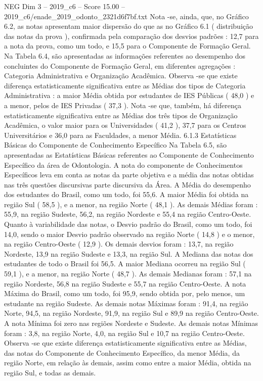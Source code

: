 \begin{textsample}{NEG Dim 3 – 2019\_c6 – Score 15.00 – 2019\_c6/enade\_2019\_odonto\_2321d6f7bf.txt}
Nota -se, ainda, que, no Gráfico 6.2, as notas apresentam maior dispersão do que as no Gráfico 6.1 ( distribuição das notas da prova ), confirmada pela comparação dos desvios padrões : 12,7 para a nota da prova, como um todo, e 15,5 para o Componente de Formação Geral.
Na Tabela 6.4, são apresentadas as informações referentes ao desempenho dos concluintes do Componente de Formação Geral, em diferentes agregações : Categoria Administrativa e Organização Acadêmica.
Observa -se que existe diferença estatisticamente significativa entre as Médias dos tipos de Categoria Administrativa : a maior Média obtida por estudantes de IES Públicas ( 48,0 ) e a menor, pelos de IES Privadas ( 37,3 ).
Nota -se que, também, há diferença estatisticamente significativa entre as Médias dos três tipos de Organização Acadêmica, o valor maior para os Universidades ( 41,2 ), 37,7 para os Centros Universitários e 36,0 para as Faculdades, a menor Média. 6.1.3 Estatísticas Básicas do Componente de Conhecimento Específico Na Tabela 6.5, são apresentadas as Estatísticas Básicas referentes ao Componente de Conhecimento Específico da área de Odontologia.
A nota do componente de Conhecimentos Específicos leva em conta as notas da parte objetiva e a média das notas obtidas nas três questões discursivas parte discursiva da Área.
A Média do desempenho dos estudantes do Brasil, como um todo, foi 55,6.
A maior Média foi obtida na região Sul ( 58,5 ), e a menor, na região Norte ( 48,1 ).
As demais Médias foram : 55,9, na região Sudeste, 56,2, na região Nordeste e 55,4 na região Centro-Oeste.
Quanto à variabilidade das notas, o Desvio padrão do Brasil, como um todo, foi 14,0, sendo o maior Desvio padrão observado na região Norte ( 14,8 ) e o menor, na região Centro-Oeste ( 12,9 ).
Os demais desvios foram : 13,7, na região Nordeste, 13,9 na região Sudeste e 13,3, na região Sul.
A Mediana das notas dos estudantes de todo o Brasil foi 56,5.
A maior Mediana ocorreu na região Sul ( 59,1 ), e a menor, na região Norte ( 48,7 ).
As demais Medianas foram : 57,1 na região Nordeste, 56,8 na região Sudeste e 55,7 na região Centro-Oeste.
A nota Máxima do Brasil, como um todo, foi 95,9, sendo obtida por, pelo menos, um estudante na região Sudeste.
As demais notas Máximas foram : 91,4, na região Norte, 94,5, na região Nordeste, 91,9, na região Sul e 89,9 na região Centro-Oeste.
A nota Mínima foi zero nas regiões Nordeste e Sudeste.
As demais notas Mínimas foram : 3,8, na região Norte, 4,0, na região Sul e 10,7 na região Centro-Oeste.
Observa -se que existe diferença estatisticamente significativa entre as Médias, das notas do Componente de Conhecimento Específico, da menor Média, da região Norte, em relação às demais, assim como entre a maior Média, obtida na região Sul, e todas as demais.

\end{textsample}
